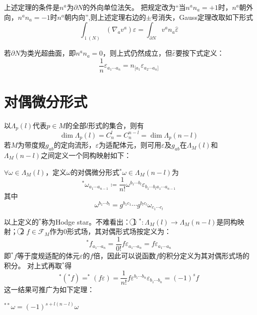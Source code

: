 \begin{note}
    上述定理的条件是$n^a$为$\partial N$的外向单位法矢。
    把规定改为``当$n^an_a = +1$时，$n^a$朝外向，$n^an_a = -1$时$n^a$朝内向'',则上述定理右边的$\pm$号消失，Gauss定理改取如下形式
    $$\int_{\operatorname{i}(N)}(\nabla_av^a)\varepsilon = \int_{\partial N}v^an_a\hat\varepsilon$$
    
    若$\partial N$为类光超曲面，即$n^an_a = 0$，则上式仍然成立，但$\hat\varepsilon$要按下式定义：
    $$\frac{1}{n}\varepsilon_{a_1 \cdots a_n} = n_{[a_1}\hat\varepsilon_{a_2 \cdots a_n]}$$
\end{note}

\section{对偶微分形式}

以$\Lambda_p(l)$代表$p \in M$的全部$l$形式的集合，则有
$$\dim\Lambda_p(l) = C^l_n = C^{n - l}_n = \dim\Lambda_p(n - l)$$
若$M$为带度规$g_{ab}$的定向流形，$\varepsilon$为适配体元，则可用$\varepsilon$及$g_{ab}$在$\Lambda_M(l)$和$\Lambda_M(n - l)$之间定义一个同构映射如下：

\begin{definition}
    $\forall \omega \in \Lambda_M(l)$，定义$\omega$的对偶微分形式$^*\omega \in \Lambda_M(n - l)$为
    $$^*\omega_{a_1 \cdots a_{n - 1}} \coloneq \frac{1}{n!}\omega^{b_1 \cdots b_l}\varepsilon_{b_1 \cdots b_l a_1 \cdots a_{n - 1}}$$
    其中
    $$\omega^{b_1 \cdots b_l} = g^{b_1c_1} \cdots g^{b_lc_l}\omega_{c_1 \cdots c_l}$$
\end{definition}

\begin{note}
    以上定义的$^*$称为Hodge star。不难看出：
    \textcircled{1} $^* \colon \Lambda_M(l) \to \Lambda_M(n - l)$是同构映射；
    \textcircled{2} $f \in \mathscr{F}_M$作为$0$形式场，其对偶形式场按定义为：
    $$^*f_{a_1 \cdots a_n} = \frac{1}{0!}f\varepsilon_{a_1 \cdots a_n} = f\varepsilon_{a_1 \cdots a_n}$$
    即$^*f$等于度规适配的体元$\varepsilon$的$f$倍，因此可以说函数$f$的积分定义为其对偶形式场的积分。
    对上式再取$^*$得
    $$^*(^*f) = ^*(f\varepsilon) = \frac{1}{n!}f\varepsilon^{b_1 \cdots b_n}\varepsilon_{b_1 \cdots b_n} = (-1)^sf$$
    这一结果可推广为如下定理：
\end{note}

\begin{theorem}
    $^{**}\omega = (-1)^{s + l(n - l)}\omega$
\end{theorem}

